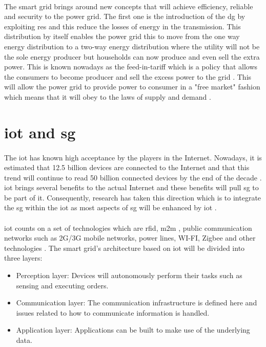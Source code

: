 \documentclass[oneside,12pt,a4paper,final]{book}
\begin{document}
\paragraph{}
The smart grid brings around new concepts that will achieve efficiency, reliable and security to the power grid. The first one is the introduction of the \gls{dg} by exploiting \gls{res} \cite{ref6} and this reduce the losses of energy in the transmission.  This distribution by itself enables the power grid this to move from the one way energy distribution to a two-way energy distribution where the utility will not be the sole energy producer but households can now produce and even sell the extra power. This is known nowadays as the feed-in-tariff which is a policy that allows the consumers to become producer and sell the excess power to the grid \cite{ref7}. This will allow the power grid to provide power to consumer in a "free market" fashion which means that it will obey to the laws of supply and demand \cite{ref7}. 
\section{\gls{iot} and \gls{sg}}
\paragraph{}
The \gls{iot} has known high acceptance by the players in the Internet. Nowadays, it is estimated that 12.5 billion devices are connected to the Internet and that this trend will continue to read 50 billion connected devices by the end of the decade \cite{ref3}. \gls{iot} brings several benefits to the actual Internet and these benefits will pull \gls{sg} to be part of it. Consequently, research has taken this direction which is to integrate the \gls{sg} within the \gls{iot} as most aspects of \gls{sg} will be enhanced by \gls{iot} \cite{ref8}.
\paragraph{}
\gls{iot} counts on a set of technologies which are \gls{rfid}, \gls{m2m} \cite{ref9}, public communication networks such as 2G/3G mobile networks, power lines, WI-FI, Zigbee and other technologies \cite{ref8}. The smart grid's architecture based on \gls{iot} will be divided into three layers:
\begin{itemize}
\item Perception layer: Devices will autonomously perform their tasks such as sensing and executing orders.
\item Communication layer: The communication infrastructure is defined here and issues related to how to communicate information is handled.
\item Application layer: Applications can be built to make use of the underlying data.
\end{itemize}
\end{document}
